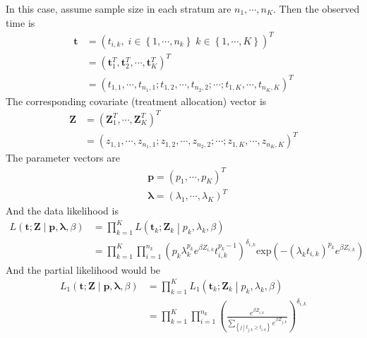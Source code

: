 \documentclass[a4paper,12pt]{article}
\begin{document}
In this case, assume sample size in each stratum are $n_1, \cdots, n_K$. Then the observed time is
\[
  \begin{aligned}
    \bm{t}
    &=
      \left(
      t_{i,k}
      ,\;
      i\in\left\{1, \cdots, n_k\right\}
      \;
      k\in\left\{1, \cdots, K\right\}
      \right)^T    \\
    &= \left(
      \bm{t}_1^T, \bm{t}_2^T, \cdots, \bm{t}_K^T
      \right)^T    \\
    &= \left(
      t_{1, 1}, \cdots, t_{n_1, 1};
      t_{1, 2}, \cdots, t_{n_2, 2};
      \cdots ;
      t_{1, K}, \cdots, t_{n_K, K}
      \right)^T
  \end{aligned} 
\]
The corresponding covariate (treatment allocation) vector is
\[
  \begin{aligned}
    \bm{Z}
    &= \left(
      \bm{Z}_1^T, \cdots, \bm{Z}_K^T
      \right)^T    \\
    &= \left(
      z_{1, 1}, \cdots, z_{n_1, 1};
      z_{1, 2}, \cdots, z_{n_2, 2};
      \cdots ;
      z_{1, K}, \cdots, z_{n_K, K}
      \right)^T
  \end{aligned}
\]
The parameter vectors are
\[
  \begin{aligned}
    & \bm{p} = \left(p_1, \cdots, p_K\right)^T    \\
    & \bm{\lambda} = \left(\lambda_1, \cdots, \lambda_K\right)^T
  \end{aligned}
\]
And the data likelihood is
\begin{equation}
  \label{eq:stratified_data_likelihood}
  \begin{aligned}
    L\left(
    \bm{t}; \bm{Z}
    \middle|
    \bm{p}, \bm{\lambda}, \beta
    \right)
    &= \prod\limits_{k = 1}^K
      L\left(\bm{t}_k; \bm{Z}_k\middle| p_k, \lambda_k, \beta\right)    \\
    &= \prod\limits_{k = 1}^K\prod\limits_{i = 1}^{n_k}
      \left(
      p_k\lambda_k^{p_k}e^{\beta Z_{i, k}}t_{i, k}^{p_k - 1}
      \right)^{\delta_{i, k}}
      \mathrm{exp}\left(
      - \left(\lambda_k t_{i, k}\right)^{p_k}
      e^{\beta Z_{i, k}}
      \right)
  \end{aligned}  
\end{equation}
And the partial likelihood would be
\[
  \begin{aligned}
    L_1\left(\bm{t}; \bm{Z}\middle|\bm{p}, \bm{\lambda}, \beta\right)
    &= \prod\limits_{k = 1}^KL_1\left(\bm{t}_k; \bm{Z}_k\middle| p_k, \lambda_k, \beta\right)    \\
    &= \prod\limits_{k = 1}^K\prod\limits_{i = 1}^{n_k}
      \left(
      \frac{
      e^{\beta Z_{i, k}}}{
      \sum\limits_{\left\{j\middle|t_{j, k}\geq t_{i, k}\right\}}e^{\beta Z_{j, k}}}
      \right)^{\delta_{i, k}}
  \end{aligned}
\]
\end{document}
